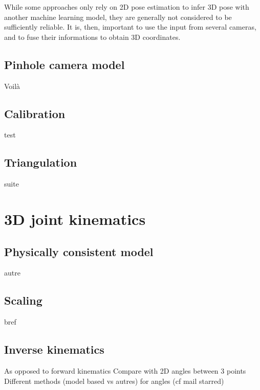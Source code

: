 While some approaches only rely on 2D pose estimation to infer 3D pose with another machine learning model, they are generally not considered to be sufficiently reliable. It is, then, important to use the input from several cameras, and to fuse their informations to obtain 3D coordinates.


\subsection{Pinhole camera model}

Voilà


\subsection{Calibration}

test


\subsection{Triangulation}

suite


\section{3D joint kinematics}

\subsection{Physically consistent model}

autre


\subsection{Scaling}

bref


\subsection{Inverse kinematics}

As opposed to forward kinematics \newline
Compare with 2D angles between 3 points \newline
Different methods (model based vs autres) for angles (cf mail starred)\newline





